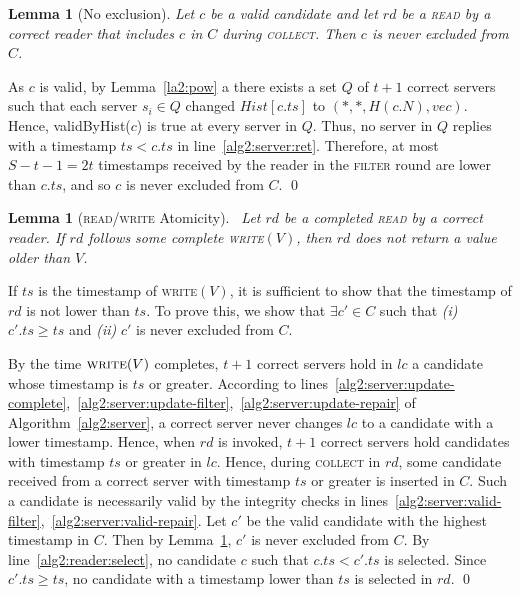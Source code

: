 \documentclass[10pt,conference,compsocconf]{IEEEtran}
\newtheorem{la}[defn]{Lemma}
\newenvironment{prooff}{\vspace{1ex}\noindent{\bf Proof:}\hspace{0.5em}}
	{\hfill\qed\vspace{1em}}
\begin{document}
\begin{la}[No exclusion]\label{la2:noexclusion}
Let $c$ be a valid candidate and let $rd$ be a \textsc{read} by a correct reader that includes $c$ in $C$ during \textsc{collect}. Then $c$ is never excluded from $C$.
\end{la}
\begin{prooff}
As $c$ is valid, by Lemma~\ref{la2:pow} a there exists a set $Q$ of $t+1$ correct servers such that each server $s_i \in Q$ changed $Hist[c.ts]$ to $(*,*,H(c.N),vec)$. Hence, \textsf{validByHist}($c$) is true at every server in $Q$. Thus, no server in $Q$ replies with a timestamp $ts < c.ts$ in line~\ref{alg2:server:ret}.
Therefore, at most $S-t-1= 2t$ timestamps received by the reader in the \textsc{filter} round are lower than $c.ts$, and so $c$ is never excluded from $C$.
\end{prooff}

\begin{la}[\textsc{read}/\textsc{write} Atomicity]~\label{la2:rwatomic}
Let $rd$ be a completed \textsc{read} by a correct reader. If $rd$ follows some complete \textsc{write}$(V)$, then $rd$ does not return a value older than $V$.
\end{la}
\begin{prooff}
If $ts$ is the timestamp of \textsc{write}$(V)$, it is sufficient to show that the timestamp of $rd$ is not lower than $ts$. To prove this, we show that $\exists c' \in C$ such that \emph{(i)} $c'.ts \geq ts$ and \emph{(ii)} $c'$ is never excluded from $C$.

By the time $\textsc{write}(V)$ completes, $t+1$ correct servers hold in $lc$ a candidate whose timestamp is $ts$ or greater. According to lines~\ref{alg2:server:update-complete},~\ref{alg2:server:update-filter},~\ref{alg2:server:update-repair} of Algorithm~\ref{alg2:server}, a correct server never changes $lc$ to a candidate with a lower timestamp. Hence, when $rd$ is invoked, $t+1$ correct servers hold candidates with timestamp $ts$ or greater in $lc$. Hence, during \textsc{collect} in $rd$, some candidate received from a correct server with timestamp $ts$ or greater is inserted in $C$. Such a candidate is necessarily valid by the integrity checks in lines~\ref{alg2:server:valid-filter},~\ref{alg2:server:valid-repair}. Let $c'$ be the valid candidate with the highest timestamp in $C$. Then by Lemma~\ref{la2:noexclusion}, $c'$ is never excluded from $C$. By line~\ref{alg2:reader:select}, no candidate $c$ such that $c.ts < c'.ts$ is selected. Since $c'.ts \geq ts$, no candidate with a timestamp lower than $ts$ is selected in $rd$.
\end{prooff}
\end{document}
